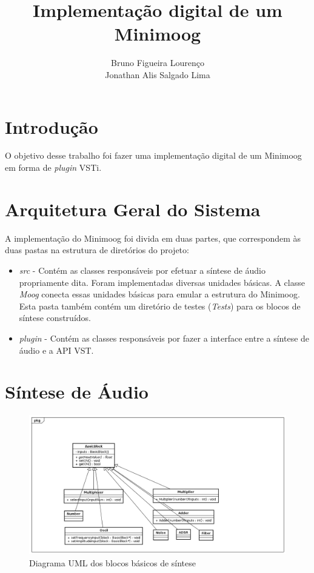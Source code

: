 \documentclass{article}
\title{Implementação digital de um Minimoog}
\author{Bruno Figueira Lourenço \\ Jonathan Alis Salgado Lima}
\begin{document}
\maketitle

\section{Introdução}
O objetivo desse trabalho foi fazer uma implementação digital de um Minimoog em forma de \emph{plugin} VSTi.



\section{Arquitetura Geral do Sistema}
A implementação do Minimoog foi divida em duas partes, que correspondem às 
duas pastas na estrutura de diretórios do projeto:

\begin{itemize}
	\item \emph{src} - Contém as classes responsáveis por efetuar 
	a síntese de áudio propriamente dita. Foram implementadas diversas 
	unidades básicas. A classe \emph{Moog} conecta essas unidades básicas para 
	emular a estrutura do Minimoog. Esta pasta também contém um diretório 
	de testes (\emph{Tests}) para os blocos de síntese construídos.
	\item \emph{plugin} - Contém as classes responsáveis por fazer a 
	interface entre a síntese de áudio e a API VST.
\end{itemize}

\section{Síntese de Áudio}


\begin{figure}
\centering
\includegraphics[scale=0.4]{Classes.png}\caption{Diagrama UML dos blocos básicos de síntese}\label{fig:uml1}
\end{figure}
\end{document}
